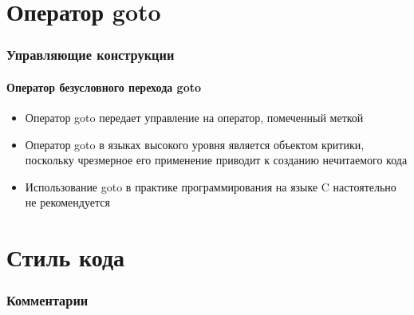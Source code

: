 \documentclass[12pt,pdf,hyperref={unicode}]{beamer}
\begin{document}
\section{Оператор goto}


\begin{frame}
\frametitle{Управляющие конструкции} 
\framesubtitle{Оператор безусловного перехода goto}

\begin{itemize}
\item Оператор goto передает управление на оператор, помеченный меткой
\item Оператор goto в языках высокого уровня является объектом критики, поскольку чрезмерное его применение приводит к созданию нечитаемого кода
\item Использование goto в практике программирования на языке C настоятельно не рекомендуется
\end{itemize}


\end{frame}

\section{Стиль кода}


\begin{frame}
\frametitle{Комментарии}



\end{frame}
\end{document}
